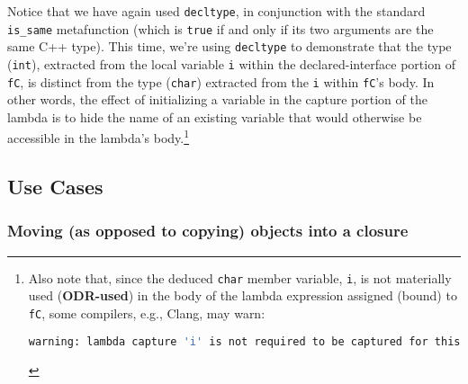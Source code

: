 \noindent Notice that we have again used \texttt{decltype}, in conjunction with
the standard \texttt{is\_same} metafunction (which is \texttt{true} if
and only if its two arguments are the same C++ type). This time, we're using \texttt{decltype} to
demonstrate that the type (\texttt{int}), extracted from the local
variable \texttt{i} within the declared-interface portion of
\texttt{fC}, is distinct from the type (\texttt{char}) extracted from
the \texttt{i} within \texttt{fC}'s body. In other words, the effect
of initializing a variable in the capture portion of the lambda is to
hide the name of an existing variable that would otherwise be accessible
in the lambda's body.{\cprotect\footnote{Also note that, since the
deduced \texttt{char} member variable, \texttt{i}, is not materially
used (\textbf{ODR-used}) in the body of the lambda expression assigned
(bound) to \texttt{fC}, some compilers, e.g., Clang, may warn:

\begin{lstlisting}[language=bash,basicstyle={\ttfamily\footnotesize}]
warning: lambda capture 'i' is not required to be captured for this use
\end{lstlisting}
      }}

\subsection[Use Cases]{Use Cases}\label{use-cases-lambdacapture}

\subsubsection[Moving (as opposed to copying) objects into a closure]{Moving (as opposed to copying) objects into a closure}\label{moving-(as-opposed-to-copying)-objects-into-a-closure}

